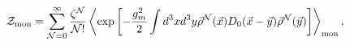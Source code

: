 \begin{equation}
\label{1}
{\cal Z}_{\rm mon}=\sum\limits_{{\cal N}=0}^{\infty}\frac{\zeta^{\cal N}}{{\cal N}!}
\left<\exp\left[-\frac{g_m^2}{2}\int d^3x d^3y\vec\rho^{\cal N}(\vec x)D_0(\vec x-\vec y)
\vec\rho^{\cal N}(\vec y)\right]\right>_{\rm mon},
\end{equation}


